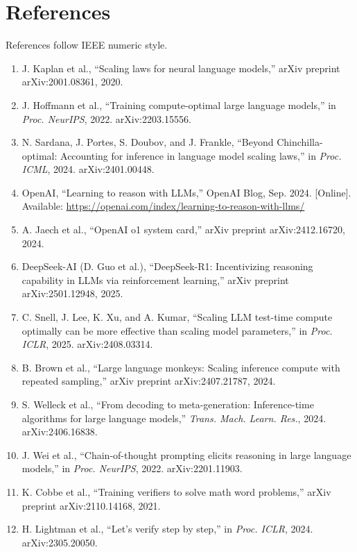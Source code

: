 \documentclass[10pt]{article}
\begin{document}
\section*{References}
\small\sloppy
References follow IEEE numeric style.

\begin{enumerate}
\itemsep0.15em
\item[{[1]}] J. Kaplan et al., ``Scaling laws for neural language models,'' arXiv preprint arXiv:2001.08361, 2020.
\item[{[2]}] J. Hoffmann et al., ``Training compute-optimal large language models,'' in \emph{Proc. NeurIPS}, 2022. arXiv:2203.15556.
\item[{[3]}] N. Sardana, J. Portes, S. Doubov, and J. Frankle, ``Beyond Chinchilla-optimal: Accounting for inference in language model scaling laws,'' in \emph{Proc. ICML}, 2024. arXiv:2401.00448.
\item[{[4]}] OpenAI, ``Learning to reason with LLMs,'' OpenAI Blog, Sep. 2024. [Online]. Available: \url{https://openai.com/index/learning-to-reason-with-llms/}
\item[{[5]}] A. Jaech et al., ``OpenAI o1 system card,'' arXiv preprint arXiv:2412.16720, 2024.
\item[{[6]}] DeepSeek-AI (D. Guo et al.), ``DeepSeek-R1: Incentivizing reasoning capability in LLMs via reinforcement learning,'' arXiv preprint arXiv:2501.12948, 2025.
\item[{[7]}] C. Snell, J. Lee, K. Xu, and A. Kumar, ``Scaling LLM test-time compute optimally can be more effective than scaling model parameters,'' in \emph{Proc. ICLR}, 2025. arXiv:2408.03314.
\item[{[8]}] B. Brown et al., ``Large language monkeys: Scaling inference compute with repeated sampling,'' arXiv preprint arXiv:2407.21787, 2024.
\item[{[9]}] S. Welleck et al., ``From decoding to meta-generation: Inference-time algorithms for large language models,'' \emph{Trans. Mach. Learn. Res.}, 2024. arXiv:2406.16838.
\item[{[10]}] J. Wei et al., ``Chain-of-thought prompting elicits reasoning in large language models,'' in \emph{Proc. NeurIPS}, 2022. arXiv:2201.11903.
\item[{[11]}] K. Cobbe et al., ``Training verifiers to solve math word problems,'' arXiv preprint arXiv:2110.14168, 2021.
\item[{[12]}] H. Lightman et al., ``Let's verify step by step,'' in \emph{Proc. ICLR}, 2024. arXiv:2305.20050.

\end{enumerate}
\end{document}
